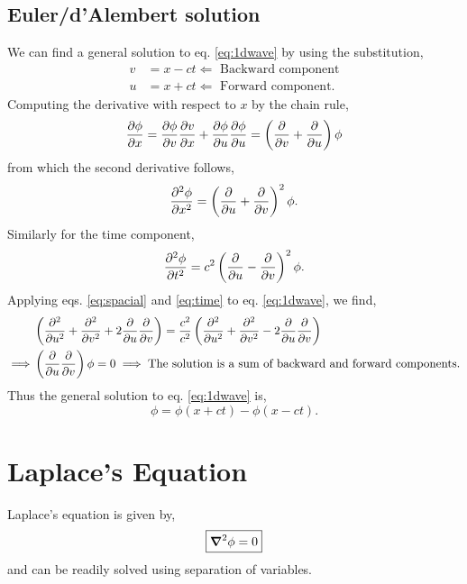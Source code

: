 \documentclass{book}
\begin{document}
\subsection{Euler/d'Alembert solution}
We can find a general solution to eq. \eqref{eq:1dwave} by using the substitution,
\begin{align}
	v & = x - ct \Leftarrow \text{ Backward component}\label{eq:backward}\\
	u & = x + ct \Leftarrow \text{ Forward component}\label{eq:forward}.
\end{align}
Computing the derivative with respect to $x$ by the chain rule,
\begin{equation}
	\pdv{\phi}{x} = \pdv{\phi}{v}\pdv{v}{x} + \pdv{\phi}{u}\pdv{\phi}{u} = \left(\pdv{v} + \pdv{u}\right)\phi
\end{equation}
from which the second derivative follows,
\begin{equation}
	\pdv[2]{\phi}{x} = \left(\pdv{u}+\pdv{v}\right)^2\phi. \label{eq:spacial}
\end{equation}
Similarly for the time component,
\begin{equation}
	\pdv[2]{\phi}{t} = c^2\left(\pdv{u}-\pdv{v}\right)^2\phi. \label{eq:time}
\end{equation}
Applying eqs. \eqref{eq:spacial} and \eqref{eq:time} to eq. \eqref{eq:1dwave}, we find,
\begin{equation}
	\begin{split}
		& \left(\pdv[2]{u} + \pdv[2]{v} + 2\pdv{u}\pdv{v}\right) = \frac{c^2}{c^2}\left(\pdv[2]{u} + \pdv[2]{v} - 2\pdv{u}\pdv{v}\right) \\
		\implies & \left(\pdv{u}\pdv{v}\right)\phi = 0 \implies \text{The solution is a sum of backward and forward components.}
	\end{split}
\end{equation}
Thus the general solution to eq. \eqref{eq:1dwave} is,
\begin{equation}
	\boxed{\phi = \phi(x + ct) - \phi(x-ct)}.
\end{equation}

\section{Laplace's Equation}
Laplace's equation is given by,
\begin{equation}
	\boxed{\grad^2\phi = 0}
\end{equation}
and can be readily solved using separation of variables.
\end{document}
